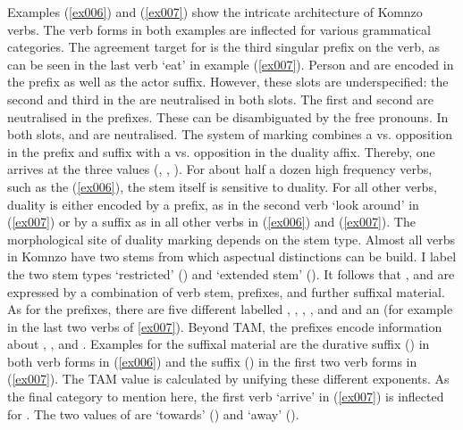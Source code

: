 Examples (\ref{ex006}) and (\ref{ex007}) show the intricate architecture of Komnzo verbs. The verb forms in both examples are inflected for various grammatical categories. The agreement target for  is the third  singular prefix on the verb, as can be seen in the last verb `eat' in example (\ref{ex007}). Person and  are encoded in the  prefix as well as the actor suffix. However, these slots are underspecified: the second and third  in the  are neutralised in both slots. The first  and second  are neutralised in the prefixes. These can be disambiguated by the free pronouns. In both slots,  and  are neutralised. The system of  marking combines a  vs.  opposition in the prefix and suffix with a  vs.  opposition in the duality affix. Thereby, one arrives at the three  values (\Sg, \Du, \Pl). For about half a dozen high frequency verbs, such as the  (\ref{ex006}), the stem itself is sensitive to duality. For all other verbs, duality is either encoded by a prefix, as in the second verb `look around' in (\ref{ex007}) or by a suffix as in all other verbs in (\ref{ex006}) and (\ref{ex007}). The morphological site of duality marking depends on the stem type. Almost all verbs in Komnzo have two stems from which aspectual distinctions can be build. I label the two stem types `restricted' ({\Rs}) and `extended stem' (\Ext). It follows that ,  and  are expressed by a combination of verb stem, prefixes, and further suffixal material. As for the prefixes, there are five different  labelled \Alph{}, \Bet{}, \Betaone{}, \Betatwo{}, and \Gam{} and an   (for example in the last two verbs of \ref{ex007}). Beyond TAM, the prefixes encode information about , , and . Examples for the suffixal material are the durative suffix (\Dur{}) in both verb forms in (\ref{ex006}) and the  suffix (\Pst{}) in the first two verb forms in (\ref{ex007}). The TAM value is calculated by unifying these different exponents. As the final category to mention here, the first verb `arrive' in (\ref{ex007}) is inflected for . The two values of  are  `towards' (\Venit) and  `away' (\Andat).


